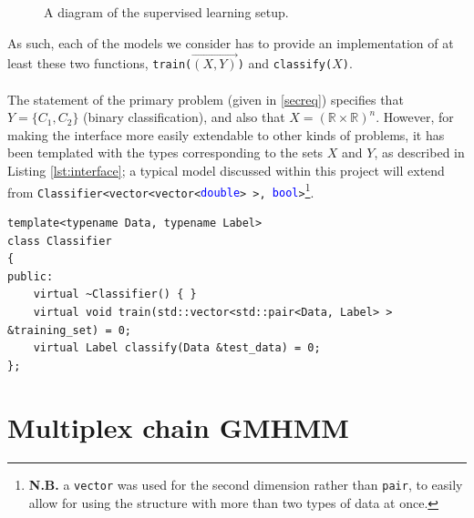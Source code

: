 \documentclass[12pt,a4paper,twoside,openright]{report}
\begin{document}
\begin{figure}[H]
\centering
{}
	\caption[Diagram of the supervised learning setup]{A diagram of the supervised learning setup.}\label{figsuplrn}
\end{figure}
\noindent As such, each of the models we consider has to provide an implementation of at least these two functions, \texttt{train($\overrightarrow{(X, Y)}$)} and \texttt{classify($X$)}.\\ \\
The statement of the primary problem (given in \cref{secreq}) specifies that $Y = \{C_1, C_2\}$ (binary classification), and also that $X = (\mathbb{R} \times \mathbb{R})^n$. However, for making the interface more easily extendable to other kinds of problems, it has been templated with the types corresponding to the sets $X$ and $Y$, as described in Listing \ref{lst:interface}; a typical model discussed within this project will extend from \texttt{Classifier<vector<vector<\textcolor{blue}{double}> >, \textcolor{blue}{bool}>}\footnote{{\bf N.B.} a \texttt{vector} was used for the second dimension rather than \texttt{pair}, to easily allow for using the structure with more than two types of data at once.}.
\begin{lstlisting}[caption={An interface for a classifier in the supervised learning setup.}, label={lst:interface}]
template<typename Data, typename Label>
class Classifier
{
public:
	virtual ~Classifier() { }
	virtual void train(std::vector<std::pair<Data, Label> > &training_set) = 0;
	virtual Label classify(Data &test_data) = 0;
};
\end{lstlisting}

\section{Multiplex chain GMHMM}\label{secmuxchngmhmm}
\end{document}

